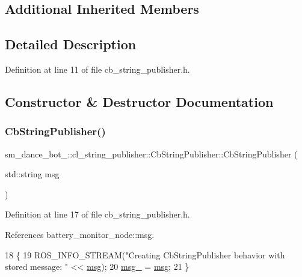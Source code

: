 \subsection*{Additional Inherited Members}


\subsection{Detailed Description}


Definition at line 11 of file cb\+\_\+string\+\_\+publisher.\+h.



\subsection{Constructor \& Destructor Documentation}
\mbox{\label{classsm__dance__bot__2_1_1cl__string__publisher_1_1CbStringPublisher_a557c3ef581e3aa4d30ab4218b7d0f10b}} 
\subsubsection{\texorpdfstring{Cb\+String\+Publisher()}{CbStringPublisher()}}
{\footnotesize\ttfamily sm\+\_\+dance\+\_\+bot\+\_\+::cl\+\_\+string\+\_\+publisher\+::\+Cb\+String\+Publisher\+::\+Cb\+String\+Publisher (\begin{DoxyParamCaption}\item[{std\+::string}]{msg }\end{DoxyParamCaption})\hspace{0.3cm}{\ttfamily [inline]}}



Definition at line 17 of file cb\+\_\+string\+\_\+publisher.\+h.



References battery\+\_\+monitor\+\_\+node\+::msg.


\begin{DoxyCode}
18     \{
19         ROS\_INFO\_STREAM(\textcolor{stringliteral}{"Creating CbStringPublisher behavior with stored message: "} << 
      \hyperlink{namespacebattery__monitor__node_ab1920c64448816edd4064e494275fdff}{msg});
20         \hyperlink{classsm__dance__bot__2_1_1cl__string__publisher_1_1CbStringPublisher_aa4ec5323d074594371424668619997da}{msg\_} = \hyperlink{namespacebattery__monitor__node_ab1920c64448816edd4064e494275fdff}{msg};
21     \}
\end{DoxyCode}


